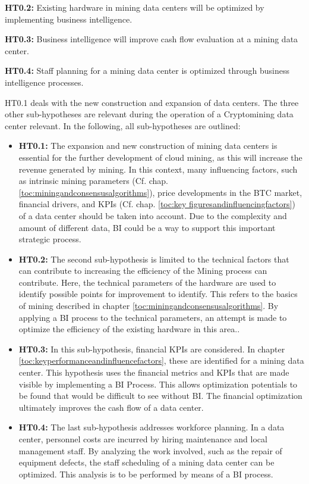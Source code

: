 \textbf{\ac{HT0.2}: }Existing hardware in mining data centers will be optimized by implementing business intelligence. 

\textbf{\ac{HT0.3}: }Business intelligence will improve cash flow evaluation at a mining data center. 

\textbf{\ac{HT0.4}: }Staff planning for a mining data center is optimized through business intelligence processes. 

\ac{HT0.1} deals with the new construction and expansion of data centers. The three other sub-hypotheses are relevant during the operation of a
Cryptomining data center relevant. In the following, all sub-hypotheses are outlined: 

\begin{itemize} 
    \item \textbf{\ac{HT0.1}: }The expansion and new construction of mining data centers is essential for the further development of cloud mining,
    as this will increase the revenue generated by mining. In this context, many influencing factors, such as intrinsic mining
    parameters (Cf. chap. \ref{toc:miningandconsensusalgorithms}), price developments in the \ac{BTC} market, financial drivers, and \acp{KPI}
    (Cf. chap. \ref{toc:key figuresandinfluencingfactors}) of a data center should be taken into account. Due to the complexity and amount of
    different data, \ac{BI} could be a way to support this important strategic process. 
    \item \textbf{\ac{HT0.2}: }The second sub-hypothesis is limited to the technical factors that can contribute to increasing the efficiency of the
    Mining process can contribute. Here, the technical parameters of the hardware are used to identify possible points for improvement
    to identify. This refers to the basics of mining described in chapter \ref{toc:miningandconsensusalgorithms}.
    By applying a \ac{BI} process to the technical parameters, an attempt is made to optimize the efficiency of the existing hardware in this area..
    \item \textbf{\ac{HT0.3}: }In this sub-hypothesis, financial \acp{KPI} are considered. In chapter
    \ref{toc:keyperformanceandinfluencefactors}, these are identified for a mining data center. This hypothesis uses the financial
    metrics and \acp{KPI} that are made visible by implementing a \ac{BI} Process. This allows optimization potentials to be
    found that would be difficult to see without \ac{BI}. The financial optimization ultimately improves the cash flow of a
    data center. 
    \item \textbf{\ac{HT0.4}: }The last sub-hypothesis addresses workforce planning. In a data center, personnel costs are incurred by
    hiring maintenance and local management staff. By analyzing the work involved, such as the
    repair of equipment defects, the staff scheduling of a mining data center can be optimized. This analysis is to be performed by means of a
    \ac{BI} process.
\end{itemize}


